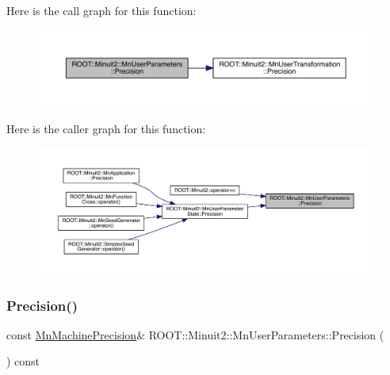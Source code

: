 Here is the call graph for this function\+:\nopagebreak
\begin{figure}[H]
\begin{center}
\leavevmode
\includegraphics[width=350pt]{d6/d10/classROOT_1_1Minuit2_1_1MnUserParameters_a52f62fcd0d9d9f6e907b07cc0194f547_cgraph}
\end{center}
\end{figure}
Here is the caller graph for this function\+:\nopagebreak
\begin{figure}[H]
\begin{center}
\leavevmode
\includegraphics[width=350pt]{d6/d10/classROOT_1_1Minuit2_1_1MnUserParameters_a52f62fcd0d9d9f6e907b07cc0194f547_icgraph}
\end{center}
\end{figure}
\mbox{\label{classROOT_1_1Minuit2_1_1MnUserParameters_ac10a27293b367e8b74016e625a90b661}} 
\subsubsection{\texorpdfstring{Precision()}{Precision()}\hspace{0.1cm}{\footnotesize\ttfamily [2/2]}}
{\footnotesize\ttfamily const \mbox{\hyperlink{classROOT_1_1Minuit2_1_1MnMachinePrecision}{Mn\+Machine\+Precision}}\& R\+O\+O\+T\+::\+Minuit2\+::\+Mn\+User\+Parameters\+::\+Precision (\begin{DoxyParamCaption}{ }\end{DoxyParamCaption}) const}

